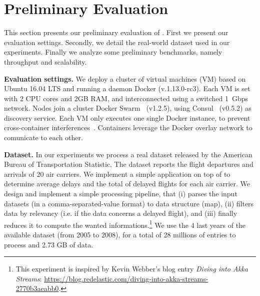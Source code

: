 \section{Preliminary Evaluation}
\label{sec:eval}

This section presents our preliminary evaluation of \SYS.
First we present our evaluation settings.
Secondly, we detail the real-world dataset used in our experiments.
Finally we analyze some preliminary benchmarks, namely throughput and scalability.

\textbf{Evaluation settings.} We deploy a cluster of virtual machines (VM) based on Ubuntu 16.04 LTS and running a daemon Docker (v.1.13.0-rc3).
Each VM is set with 2 CPU cores and 2GB RAM, and interconnected using a switched 1~Gbps network.
Nodes join a cluster Docker Swarm~\cite{docker:swarm_2016} (v1.2.5), using Consul~\cite{consul} (v0.5.2) as discovery service.
Each VM only executes one single Docker instance, to prevent cross-container interferences~\cite{koh2007analysis}.
Containers leverage the Docker overlay network to comunicate to each other.

\textbf{Dataset.} In our experiments we process a real dataset released by the American Bureau of Transportation Statistic\cite{rita:bts}.
The dataset reports the flight departures and arrivals of 20 air carriers\cite{statistical_computing:data}.
We implement a simple application on top of \SYS to determine average delays and the total of delayed flights for each air carrier.
We design and implement a simple processing pipeline, that (i) parses the input datasets (in a comma-separated-value format) to data structure (map), (ii) filters data by relevancy (i.e. if the data concerns a delayed flight), and (iii) finally reduces it to compute the wanted informations.\footnote{This experiment is inspired by Kevin Webber's blog entry \emph{Diving into Akka Streams}: \url{https://blog.redelastic.com/diving-into-akka-streams-2770b3aeabb0}.}
We use the 4 last years of the available dataset (from 2005 to 2008), for a total of 28 millions of entries to process and 2.73 GB of data.

